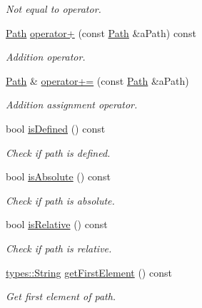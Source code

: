 \begin{DoxyCompactItemize}
\begin{DoxyCompactList}\small\item\em Not equal to operator. \end{DoxyCompactList}\item 
\hyperlink{classlibrary_1_1core_1_1fs_1_1Path}{Path} \hyperlink{classlibrary_1_1core_1_1fs_1_1Path_a3f86a7054939a51f44b2f5a796470071}{operator+} (const \hyperlink{classlibrary_1_1core_1_1fs_1_1Path}{Path} \&a\+Path) const
\begin{DoxyCompactList}\small\item\em Addition operator. \end{DoxyCompactList}\item 
\hyperlink{classlibrary_1_1core_1_1fs_1_1Path}{Path} \& \hyperlink{classlibrary_1_1core_1_1fs_1_1Path_a3fae713dbf257fdcec2fdb2ec6c27256}{operator+=} (const \hyperlink{classlibrary_1_1core_1_1fs_1_1Path}{Path} \&a\+Path)
\begin{DoxyCompactList}\small\item\em Addition assignment operator. \end{DoxyCompactList}\item 
bool \hyperlink{classlibrary_1_1core_1_1fs_1_1Path_a4315cfd12f61bf477e010f33122c3d0c}{is\+Defined} () const
\begin{DoxyCompactList}\small\item\em Check if path is defined. \end{DoxyCompactList}\item 
bool \hyperlink{classlibrary_1_1core_1_1fs_1_1Path_a9a5772dfc1273a74137ca301e9a84d61}{is\+Absolute} () const
\begin{DoxyCompactList}\small\item\em Check if path is absolute. \end{DoxyCompactList}\item 
bool \hyperlink{classlibrary_1_1core_1_1fs_1_1Path_a97cf61b699efe17e23ac3a91daf897e2}{is\+Relative} () const
\begin{DoxyCompactList}\small\item\em Check if path is relative. \end{DoxyCompactList}\item 
\hyperlink{classlibrary_1_1core_1_1types_1_1String}{types\+::\+String} \hyperlink{classlibrary_1_1core_1_1fs_1_1Path_a431c7842c8a0d5fc314b676a8487e5af}{get\+First\+Element} () const
\begin{DoxyCompactList}\small\item\em Get first element of path. \end{DoxyCompactList}\item 

\end{DoxyCompactItemize}
